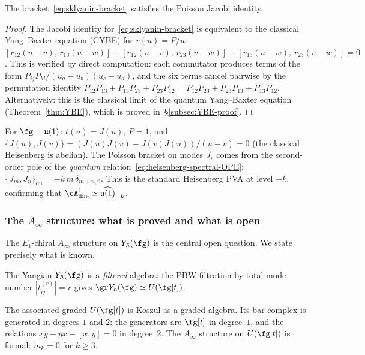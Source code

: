 \begin{proposition}
\label{prop:sklyanin-jacobi}
The bracket~\eqref{eq:sklyanin-bracket} satisfies the Poisson
Jacobi identity.
\end{proposition}

\begin{proof}
The Jacobi identity for~\eqref{eq:sklyanin-bracket} is
equivalent to the classical Yang--Baxter equation (CYBE) for
$r(u) = P/u$:
$[r_{12}(u{-}v),\, r_{13}(u{-}w)]
+ [r_{12}(u{-}v),\, r_{23}(v{-}w)]
+ [r_{13}(u{-}w),\, r_{23}(v{-}w)] = 0$.
This is verified by direct computation: each commutator
produces terms of the form $P_{ij}P_{kl}/(u_a - u_b)(u_c - u_d)$,
and the six terms cancel pairwise by the permutation identity
$P_{12}P_{13} + P_{13}P_{23} + P_{23}P_{12}
= P_{12}P_{23} + P_{23}P_{13} + P_{13}P_{12}$.
Alternatively: this is the classical limit of the quantum
Yang--Baxter equation (Theorem~\ref{thm:YBE}), which is
proved in~\S\ref{subsec:YBE-proof}.
\end{proof}

\begin{computation}
\label{comp:heisenberg-sklyanin}
For $\fg = \mathfrak{u}(1)$: $t(u) = J(u)$,
$P = 1$, and
$\{J(u), J(v)\} = (J(u) J(v) - J(v) J(u))/(u-v) = 0$
(the classical Heisenberg is abelian). The Poisson bracket on
modes $J_r$ comes from the second-order pole of the
\emph{quantum} relation~\eqref{eq:heisenberg-spectral-OPE}:
$\{J_m, J_n\}_{\mathrm{qu}} = -k\,m\,\delta_{m+n,0}$.
This is the standard Heisenberg PVA at level $-k$, confirming
that $\cA^!_{\mathrm{line}} \simeq \widehat{\mathfrak{u}(1)}_{-k}$.
\end{computation}

\subsubsection*{The $A_\infty$ structure: what is proved and
what is open}

The $E_1$-chiral $A_\infty$ structure on $Y_\hbar(\fg)$ is
the central open question. We state precisely what is known.

The Yangian $Y_\hbar(\fg)$ is a \emph{filtered} algebra:
the PBW filtration by total mode number $|t_{ij}^{(r)}| = r$
gives $\gr Y_\hbar(\fg) \simeq U(\fg[t])$.

\begin{proposition}
\label{prop:gr-yangian-formal}
The associated graded $U(\fg[t])$ is Koszul as a graded
algebra. Its bar complex is generated in degrees $1$ and $2$:
the generators are $\fg[t]$ in degree~$1$, and the relations
$xy - yx - [x,y] = 0$ in degree~$2$. The $A_\infty$ structure
on $U(\fg[t])$ is formal: $m_k = 0$ for $k \ge 3$.
\end{proposition}

